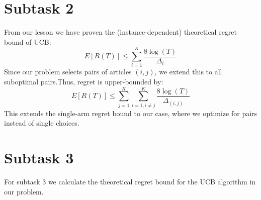 \documentclass{article}
\begin{document}
\section*{Subtask 2}
From our lesson we have proven the (instance-dependent) 
theoretical regret bound of UCB:
\[
    E[R(T)] \leq \sum_{i=1}^{K} \frac{8\log(T)}{\Delta_i}
\] 
Since our problem selects pairs of articles $(i,j)$, 
we extend this to all suboptimal pairs.Thus, regret is upper-bounded by:
\[
    E[R(T)] \leq \sum_{j=1}^{K} \sum_{i=1, i \neq j}^{K} \frac{8\log(T)}{\Delta_{(i,j)}}
\]
This extends the single-arm regret bound to our case, where we optimize for pairs instead of single choices.


\section*{Subtask 3}

For subtask 3 we calculate the theoretical regret bound for the UCB algorithm
in our problem.
\end{document}
